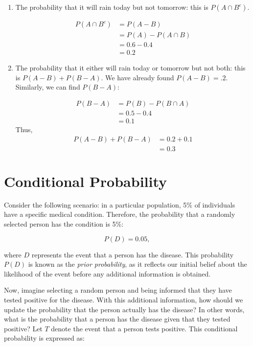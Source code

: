 \begin{example}
\begin{solution}
\begin{enumerate}[label=(\alph*)]
    \item The probability that it will rain today but not tomorrow: this is $P\left(A \cap B^c\right)$.

    \begin{align*}
        P(A \cap B^c) &= P(A - B) \\
                      &= P(A) - P(A \cap B) \\
                      &= 0.6 - 0.4 \\
                      &= 0.2
        \end{align*}

    \item The probability that it either will rain today or tomorrow but not both: this is $P(A-B)+P(B-A)$. We have already found $P(A-B)=.2$. Similarly, we can find $P(B-A)$:

    \begin{align*}
        P(B-A) & =P(B)-P(B \cap A) \\
        & =0.5-0.4 \\
        & =0.1
        \end{align*}
    Thus,
    \begin{align*}
        P(A-B)+P(B-A) &= 0.2+0.1 \\
                      &= 0.3
    \end{align*}
\end{enumerate}
\leavevmode\end{solution}
\end{example}

\section{Conditional Probability}
Consider the following scenario: in a particular population, 5\% of individuals have a specific medical condition. Therefore, the probability that a randomly selected person has the condition is 5\%:

\[
P(D) = 0.05,
\]

where \( D \) represents the event that a person has the disease. This probability \( P(D) \) is known as the \textit{prior probability}, as it reflects our initial belief about the likelihood of the event before any additional information is obtained.

Now, imagine selecting a random person and being informed that they have tested positive for the disease. With this additional information, how should we update the probability that the person actually has the disease? In other words, what is the probability that a person has the disease given that they tested positive? Let \( T \) denote the event that a person tests positive. This conditional probability is expressed as:


